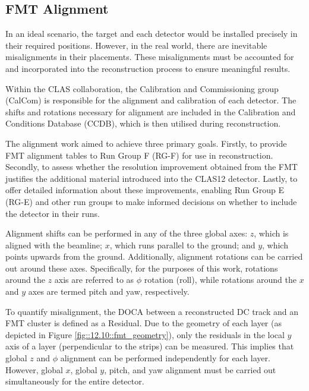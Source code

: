 \subsection{FMT Alignment}
\label{12.20::fmt_alignment}
    In an ideal scenario, the target and each detector would be installed precisely in their required positions.
    However, in the real world, there are inevitable misalignments in their placements.
    These misalignments must be accounted for and incorporated into the reconstruction process to ensure meaningful results.

    Within the CLAS collaboration, the Calibration and Commissioning group (CalCom) is responsible for the alignment and calibration of each detector.
    The shifts and rotations necessary for alignment are included in the Calibration and Conditions Database (CCDB), which is then utilised during reconstruction.

    The alignment work aimed to achieve three primary goals.
    Firstly, to provide FMT alignment tables to Run Group F (RG-F) for use in reconstruction.
    Secondly, to assess whether the resolution improvement obtained from the FMT justifies the additional material introduced into the CLAS12 detector.
    Lastly, to offer detailed information about these improvements, enabling Run Group E (RG-E) and other run groups to make informed decisions on whether to include the detector in their runs.

    Alignment shifts can be performed in any of the three global axes: $z$, which is aligned with the beamline; $x$, which runs parallel to the ground; and $y$, which points upwards from the ground.
    Additionally, alignment rotations can be carried out around these axes.
    Specifically, for the purposes of this work, rotations around the $z$ axis are referred to as $\phi$ rotation (roll), while rotations around the $x$ and $y$ axes are termed pitch and yaw, respectively.

    To quantify misalignment, the DOCA between a reconstructed DC track and an FMT cluster is defined as a Residual.
    Due to the geometry of each layer (as depicted in Figure \ref{fig::12.10::fmt_geometry}), only the residuals in the local $y$ axis of a layer (perpendicular to the strips) can be measured.
    This implies that global $z$ and $\phi$ alignment can be performed independently for each layer.
    However, global $x$, global $y$, pitch, and yaw alignment must be carried out simultaneously for the entire detector.

